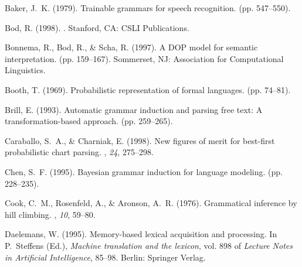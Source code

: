 \documentclass[letterpaper,mlapa]{article}
\begin{document}
%

\begin{thebibliography}{}

Baker, J.~K. (1979).
\newblock Trainable grammars for speech recognition.
 (pp.\/ 547--550).

Bod, R. (1998).
.
\newblock Stanford, CA: {CSLI} Publications.

Bonnema, R., Bod, R., \& Scha, R. (1997).
\newblock A {DOP} model for semantic interpretation.
 (pp.\/ 159--167).
\newblock Sommerset, NJ: Association for Computational Linguistics.

Booth, T. (1969).
\newblock Probabilistic representation of formal languages.
 (pp.\/ 74--81).

Brill, E. (1993).
\newblock Automatic grammar induction and parsing free text: A
  transformation-based approach.
 (pp.\/ 259--265).

Caraballo, S.~A., \& Charniak, E. (1998).
\newblock New figures of merit for best-first probabilistic chart parsing.
, {\em 24}, 275--298.

Chen, S.~F. (1995).
\newblock Bayesian grammar induction for language modeling.
 (pp.\/ 228--235).

Cook, C.~M., Rosenfeld, A., \& Aronson, A.~R. (1976).
\newblock Grammatical inference by hill climbing.
, {\em 10}, 59--80.

Daelemans, W. (1995).
\newblock Memory-based lexical acquisition and processing.
\newblock In P.~Steffens (Ed.), {\em Machine translation and the lexicon}, vol.
  898 of {\em Lecture Notes in Artificial Intelligence},  85--98. Berlin:
  Springer Verlag.


\end{thebibliography}
\end{document}
